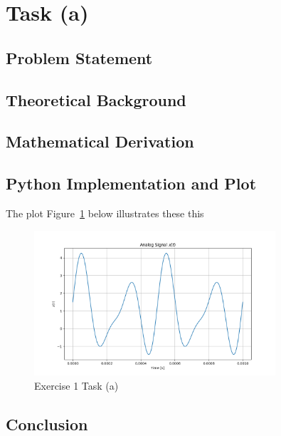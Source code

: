 \item[(a)]
\section*{Task (a)}

\subsection*{Problem Statement}

\subsection*{Theoretical Background}

\subsection*{Mathematical Derivation}

\subsection*{Python Implementation and Plot}
The plot Figure~\ref{fig:ex1_a_plot} below illustrates these this

\begin{figure}[h]
    \centering
    \includegraphics[width=0.8\textwidth]{fig/ex1_a_plot}
    \caption{Exercise 1 Task (a)}
    \label{fig:ex1_a_plot}
\end{figure}

\subsection*{Conclusion}